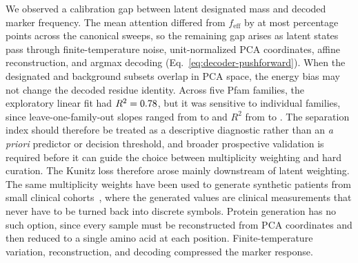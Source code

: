 We observed a calibration gap between latent designated mass and decoded marker frequency.
The mean attention differed from $f_{\mathrm{eff}}$ by at most \AttnMaxDevPts{} percentage
points across the canonical sweeps, so the remaining gap arises as latent states pass through
finite-temperature noise, unit-normalized PCA coordinates, affine reconstruction, and argmax
decoding (Eq.~\ref{eq:decoder-pushforward}). When the designated and background subsets
overlap in PCA space, the energy bias may not change the decoded residue identity. Across five
Pfam families, the exploratory linear fit had $R^{2}=0.78$, but it was sensitive to
individual families, since leave-one-family-out slopes ranged from \RelationLooSlopeMin{} to
\RelationLooSlopeMax{} and $R^{2}$ from \RelationLooRsqMin{} to \RelationLooRsqMax{}. The
separation index should therefore be treated as a descriptive diagnostic rather than an
\emph{a priori} predictor or decision threshold, and broader prospective validation is
required before it can guide the choice between multiplicity weighting and hard curation. The
Kunitz loss therefore arose mainly downstream of latent weighting. The same
multiplicity weights have been used to generate synthetic patients from small clinical
cohorts~\cite{varnerSAPatient2026}, where the generated values are clinical measurements that
never have to be turned back into discrete symbols. Protein generation has no such option, since
every sample must be reconstructed from PCA coordinates and then reduced to a single amino acid
at each position. Finite-temperature variation, reconstruction, and decoding compressed the
marker response.

